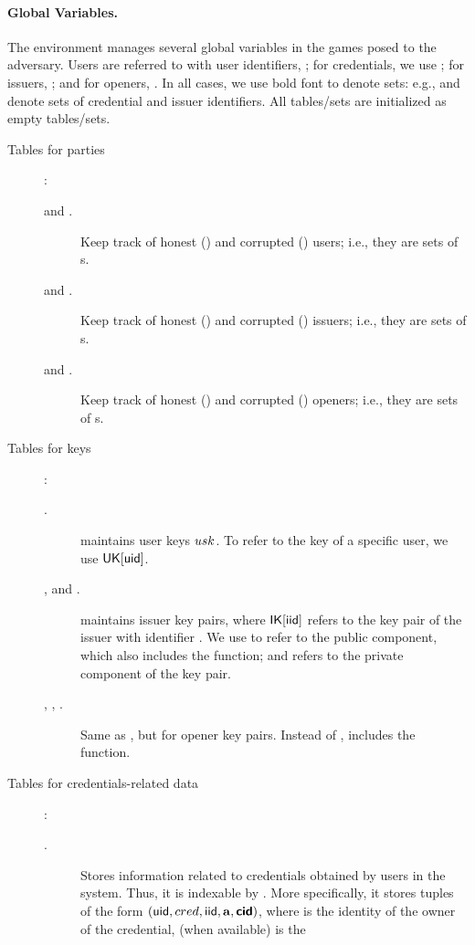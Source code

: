 \paragraph{Global Variables.} %
The environment manages several global variables in the games posed to the
adversary. Users are referred to with user identifiers, \uid; for credentials,
we use \cid; for issuers, \iid; and for openers, \oid. In all cases, we use bold
font to denote sets: e.g., \scid and \siid denote sets of credential and issuer
identifiers. All tables/sets are initialized as empty tables/sets.

\begin{description}
\item[Tables for parties]:
  \begin{description}
  \item[\HU and \CU.] Keep track of honest (\HU) and corrupted (\CU) users;
    i.e., they are sets of {\uid}s.
  \item[\HI and \CI.] Keep track of honest (\HI) and corrupted (\CI) issuers;
    i.e., they are sets of {\iid}s.
  \item[\HO and \CO.] Keep track of honest (\HO) and corrupted (\CO) openers;
    i.e., they are sets of {\oid}s.
  \end{description}
\item[Tables for keys]:
  \begin{description}
  \item[\UK.] \UK maintains user keys $usk$. To refer to the key of a specific
    user, we use $\mathsf{UK}[\mathsf{uid}]$. 
  \item[\IK, \PUBIK and \PRVIK.] \IK maintains issuer key pairs, where
    $\mathsf{IK}[\mathsf{iid}]$ refers to the key pair of the issuer with identifier \iid. We
    use \PUBIK to refer to the public component, which also includes the \fissue
    function; and \PRVIK refers to the private component of the key pair.
  \item[\OK, \PUBOK, \PRVOK.] Same as \IK, but for opener key pairs. Instead
    of \fissue, \OK includes the \finsp function.
  \end{description}
\item[Tables for credentials-related data]:
  \begin{description}
  \item[\CRED.] Stores information related to credentials obtained by users in
    the system. Thus, it is indexable by \cid. More specifically, it stores
    tuples of the form $(\mathsf{uid},cred,\mathsf{iid},\mathbf{a},\boldsymbol{\mathsf{cid}})$, where \uid is the
    identity of the owner of the credential, \cred (when available) is the

\end{description}
\end{description}
